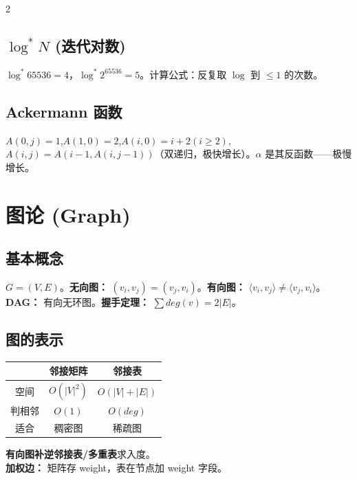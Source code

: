 \documentclass[10pt,a4paper]{article}
\begin{document}
\begin{multicols}{2}
\subsection*{$\log^*N$ (迭代对数)}

$\log^*65536=4$，$\log^*2^{65536}=5$。计算公式：反复取 $\log$ 到 $\le 1$ 的次数。

\subsection*{Ackermann 函数}

$A(0,j)=1$,$A(1,0)=2$,$A(i,0)=i+2(i\ge2)$,$A(i,j)=A(i-1,A(i,j-1))$（双递归，极快增长）。$\alpha$ 是其反函数——极慢增长。

\end{multicols}

\section*{图论 (Graph)}

\subsection*{基本概念}

$G=(V,E)$。\textbf{无向图：} $(v_i,v_j)=(v_j,v_i)$。\textbf{有向图：} $\langle v_i,v_j\rangle \neq \langle v_j,v_i\rangle$。\\
\textbf{DAG：} 有向无环图。\textbf{握手定理：} $\sum deg(v)=2|E|$。

\subsection*{图的表示}

\begin{tabular}{|c|c|c|}
\hline
& \textbf{邻接矩阵} & \textbf{邻接表} \\
\hline
空间 & $O(|V|^2)$ & $O(|V|+|E|)$ \\
判相邻 & $O(1)$ & $O(deg)$ \\
适合 & 稠密图 & 稀疏图 \\
\hline
\end{tabular}

\noindent\textbf{有向图补逆邻接表/多重表}求入度。\\
\textbf{加权边：} 矩阵存 weight，表在节点加 weight 字段。
\end{document}
